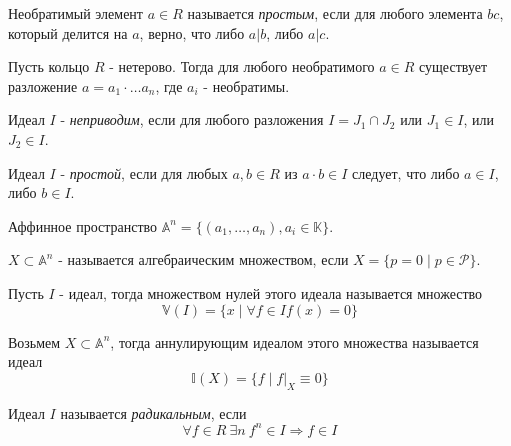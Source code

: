 \documentclass{article}
\begin{document}
\begin{definition}
    Необратимый элемент $a \in R$ называется
    \textit{простым}, если для любого элемента $b c$,
    который делится на $a$, верно, что либо $a | b$, либо $a | c$.
\end{definition}

\begin{theorem}
    Пусть кольцо $R$ - нетерово. Тогда 
    для любого необратимого $a \in R$
    существует разложение $a = a_1 \cdot \dots a_n$,
    где $a_i$ - необратимы.
\end{theorem}

\begin{definition}
    Идеал $I$ - \textit{неприводим}, если для любого разложения
    $I = J_1 \cap J_2$ или $J_1 \in I$, или $J_2 \in I$.
\end{definition}

\begin{definition}
    Идеал $I$ - \textit{простой}, если для любых
    $a, b \in R$ из $a \cdot b \in I $ следует, что
    либо $a \in I$, либо $b \in I$.
\end{definition}

\begin{definition}
    Аффинное пространство $\mathbb{A}^n = \{(a_1, \dots, a_n), a_i \in \mathbb{K}\}$.
\end{definition}

\begin{definition}
    $X \subset \mathbb{A}^n$ - называется алгебраическим множеством, если
    $X = \{p = 0 \mid p \in \mathcal{P}\}$.
\end{definition}

\begin{definition}
    Пусть $I$ - идеал, тогда множеством нулей этого
    идеала называется множество
    $$\mathbb{V}(I) = \{x \mid \forall f \in I f(x) = 0\}$$
\end{definition}

\begin{definition}
    Возьмем $X \subset \mathbb{A}^n$, тогда аннулирующим идеалом этого
    множества называется идеал
    $$\mathbb{I}(X) = \{f \mid f|_X \equiv 0\}$$
\end{definition}

\begin{definition}
    Идеал $I$ называется \textit{радикальным}, если
    $$\forall f \in R \ \exists n  \ f^n \in I \Rightarrow f \in I$$
\end{definition}
\end{document}
